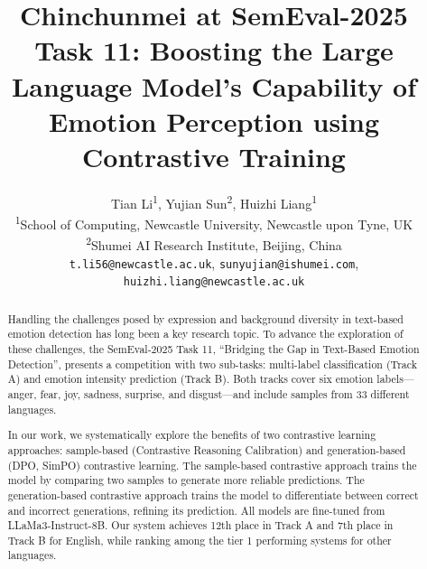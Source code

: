 \documentclass[11pt]{article}
\title{Chinchunmei at SemEval-2025 Task 11: Boosting the Large Language Model's Capability of Emotion Perception using Contrastive Training}
\author{
  Tian Li\textsuperscript{1},
  Yujian Sun\textsuperscript{2},
  Huizhi Liang\textsuperscript{1}
\\
  \textsuperscript{1}School of Computing, Newcastle University, Newcastle upon Tyne, UK\\
  \textsuperscript{2}Shumei AI Research Institute, Beijing, China
\\
  \texttt{t.li56@newcastle.ac.uk}, \texttt{sunyujian@ishumei.com},\\\texttt{huizhi.liang@newcastle.ac.uk}
}
\begin{document}
\maketitle
\begin{abstract}

Handling the challenges posed by expression and background diversity in text-based emotion detection has long been a key research topic. To advance the exploration of these challenges, the SemEval-2025 Task 11, “Bridging the Gap in Text-Based Emotion Detection”, presents a competition with two sub-tasks: multi-label classification (Track A) and emotion intensity prediction (Track B). Both tracks cover six emotion labels—anger, fear, joy, sadness, surprise, and disgust—and include samples from 33 different languages.

In our work, we systematically explore the benefits of two contrastive learning approaches: sample-based (Contrastive Reasoning Calibration) and generation-based (DPO, SimPO) contrastive learning. The sample-based contrastive approach trains the model by comparing two samples to generate more reliable predictions. The generation-based contrastive approach trains the model to differentiate between correct and incorrect generations, refining its prediction. All models are fine-tuned from LLaMa3-Instruct-8B. Our system achieves 12th place in Track A and 7th place in Track B for English, while ranking among the tier 1 performing systems for other languages.

\end{abstract}
\end{document}
